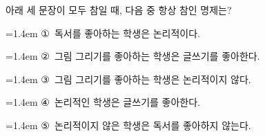 아래 세 문장이 모두 참일 때, 다음 중 항상 참인 명제는? 
\par\medskip\par\noindent\hangindent=1.4em {\small ①}\ 독서를 좋아하는 학생은 논리적이다.\par\noindent\hangindent=1.4em {\small ②}\ 그림 그리기를 좋아하는 학생은 글쓰기를 좋아한다.\par\noindent\hangindent=1.4em {\small ③}\ 그림 그리기를 좋아하는 학생은 논리적이지 않다.\par\noindent\hangindent=1.4em {\small ④}\ 논리적인 학생은 글쓰기를 좋아한다.\par\noindent\hangindent=1.4em {\small ⑤}\ 논리적이지 않은 학생은 독서를 좋아하지 않는다.\par\medskip
